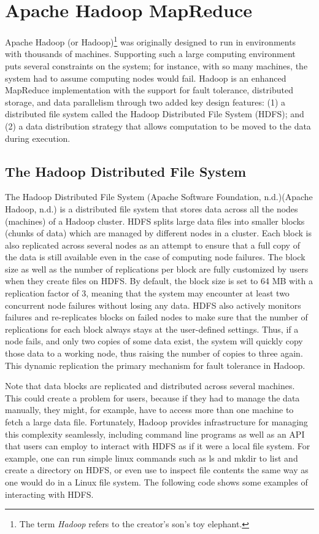 \documentclass[]{krantz}
\begin{document}
\section{Apache Hadoop MapReduce}\label{apache-hadoop-mapreduce}

Apache Hadoop (or Hadoop)\footnote{The term \emph{Hadoop} refers to the
  creator's son's toy elephant.} was originally designed to run in
environments with thousands of machines. Supporting such a large
computing environment puts several constraints on the system; for
instance, with so many machines, the system had to assume computing
nodes would fail. Hadoop is an enhanced MapReduce implementation with
the support for fault tolerance, distributed storage, and data
parallelism through two added key design features: (1) a distributed
file system called the Hadoop Distributed File System (HDFS); and (2) a
data distribution strategy that allows computation to be moved to the
data during execution.

\subsection{The Hadoop Distributed File
System}\label{the-hadoop-distributed-file-system}

The Hadoop Distributed File System (Apache Software Foundation,
n.d.)(Apache Hadoop, n.d.) is a distributed file system that stores data
across all the nodes (machines) of a Hadoop cluster. HDFS splits large
data files into smaller blocks (chunks of data) which are managed by
different nodes in a cluster. Each block is also replicated across
several nodes as an attempt to ensure that a full copy of the data is
still available even in the case of computing node failures. The block
size as well as the number of replications per block are fully
customized by users when they create files on HDFS. By default, the
block size is set to 64 MB with a replication factor of 3, meaning that
the system may encounter at least two concurrent node failures without
losing any data. HDFS also actively monitors failures and re-replicates
blocks on failed nodes to make sure that the number of replications for
each block always stays at the user-defined settings. Thus, if a node
fails, and only two copies of some data exist, the system will quickly
copy those data to a working node, thus raising the number of copies to
three again. This dynamic replication the primary mechanism for fault
tolerance in Hadoop.

Note that data blocks are replicated and distributed across several
machines. This could create a problem for users, because if they had to
manage the data manually, they might, for example, have to access more
than one machine to fetch a large data file. Fortunately, Hadoop
provides infrastructure for managing this complexity seamlessly,
including command line programs as well as an API that users can employ
to interact with HDFS as if it were a local file system. For example,
one can run simple linux commands such as ls and mkdir to list and
create a directory on HDFS, or even use to inspect file contents the
same way as one would do in a Linux file system. The following code
shows some examples of interacting with HDFS.
\end{document}
